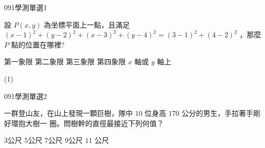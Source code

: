 \begin{QUESTIONS}
    \begin{QUESTION}
        \begin{ExamInfo}{091}{學測}{單選}{1}
        \end{ExamInfo}
        \begin{ExamAnsRateInfo}{76}{97}{83}{48}
        \end{ExamAnsRateInfo}
        \begin{QBODY}
            設 $P(x,y)$ 為坐標平面上一點，且滿足
            $(x-1)^2 +(y-2)^2 + (x-3)^2 +(y-4)^2 = (3-1)^2 +(4-2)^2$
            ，那麼 $P$ 點的位置在哪裡?
            
            \begin{QOPS} 
                \QOP 第一象限 
                \QOP 第二象限 
                \QOP 第三象限 
                \QOP 第四象限 
                \QOP $x$ 軸或 $y$ 軸上
            \end{QOPS}
        \end{QBODY}
        \begin{QFROMS}
        \end{QFROMS}
        \begin{QTAGS}\end{QTAGS}
        \begin{QANS}
            (1)
        \end{QANS}
        \begin{QSOLLIST}
        \end{QSOLLIST}
        \begin{QEMPTYSPACE}
        \end{QEMPTYSPACE}
    \end{QUESTION}
    \begin{QUESTION}
        \begin{ExamInfo}{091}{學測}{單選}{2}
        \end{ExamInfo}
        \begin{ExamAnsRateInfo}{51}{79}{51}{23}
        \end{ExamAnsRateInfo}
        \begin{QBODY}
            一群登山友，在山上發現一顆巨樹，隊中 $10$ 位身高 $170$ 公分的男生，手拉著手剛好環抱大樹一 圈。問樹幹的直徑最接近下列何值？ 
            \begin{QOPS} 
                \QOP $3$公尺 
                \QOP $5$公尺
                \QOP $7$公尺 
                \QOP $9$公尺 
                \QOP $11$ 公尺

\end{QOPS}
\end{QBODY}
\end{QUESTION}
\end{QUESTIONS}
